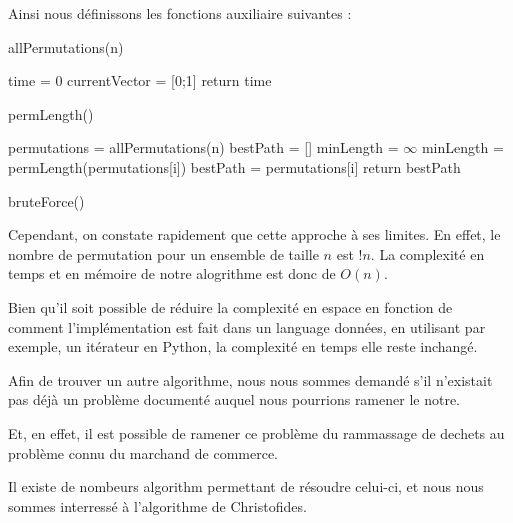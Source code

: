\documentclass{report}
\begin{document}
Ainsi nous définissons les fonctions auxiliaire suivantes : \\

\begin{algorithm}[H]
  \SetAlgoLined
  \caption{allPermutations(n)}
\end{algorithm}

\begin{algorithm}[H]
    \SetAlgoLined
    time = 0\;
    currentVector = [0;1]\;
    return time\;
    \caption{permLength()}
  \end{algorithm}

  \begin{algorithm}[H]
    \SetAlgoLined
    permutations = allPermutations(n)\;
    bestPath = []\;
    minLength = $\infty$ \;
    {
        {
            minLength = permLength(permutations[i])\;
            bestPath = permutations[i]\;
        }
    }
    return bestPath\;
    \caption{bruteForce()}
  \end{algorithm}

  Cependant, on constate rapidement que cette approche à ses limites. En effet, le nombre de permutation pour un ensemble de taille $n$ est $!n$. La complexité en temps et en mémoire de notre alogrithme est donc de $O(n)$.

  Bien qu'il soit possible de réduire la complexité en espace en fonction de comment l'implémentation est fait dans un language données, en utilisant par exemple, un itérateur en Python, la complexité en temps elle reste inchangé.

  Afin de trouver un autre algorithme, nous nous sommes demandé s'il n'existait pas déjà un problème documenté auquel nous pourrions ramener le notre.

  Et, en effet, il est possible de ramener ce problème du rammassage de dechets au problème connu du marchand de commerce.

  Il existe de nombeurs algorithm permettant de résoudre celui-ci, et nous nous sommes interressé à l'algorithme de Christofides.
  
\end{document}
